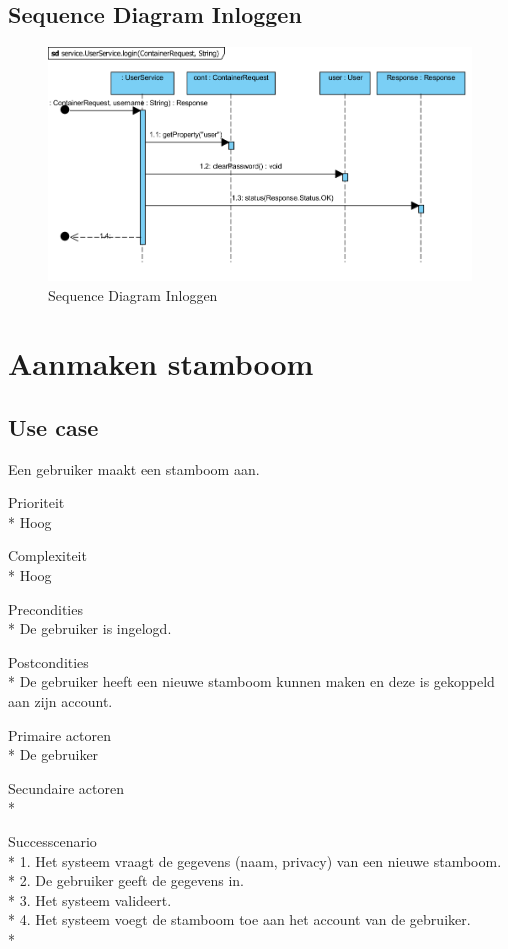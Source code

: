 \documentclass[pdftex,a4paper,12pt,twoside]{report}
\begin{document}
\subsection{Sequence Diagram Inloggen}
\begin{figure}[!htb]
\includegraphics[width=\textwidth]{images/inloggenuser.png}
\caption{Sequence Diagram Inloggen}
\end{figure}

\newpage
\section{Aanmaken stamboom}
\subsection{Use case}
Een gebruiker maakt een stamboom aan.

Prioriteit\\*
Hoog

Complexiteit\\*
Hoog

Precondities \\*
De gebruiker is ingelogd.

Postcondities \\*
De gebruiker heeft een nieuwe stamboom kunnen maken en deze is gekoppeld aan zijn account.

Primaire actoren \\*
De gebruiker

Secundaire actoren \\*

Successcenario\\*
1. Het systeem vraagt de gegevens  (naam, privacy) van een nieuwe stamboom. \\*
2. De gebruiker geeft de gegevens in.\\*
3. Het systeem valideert.\\*
4. Het systeem voegt de stamboom toe aan het account van de gebruiker.\\*
\end{document}

